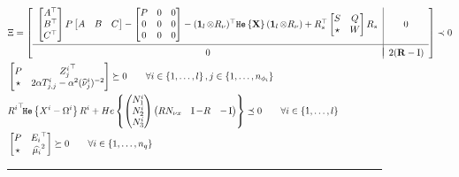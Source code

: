 \documentclass{ifacconf}
\theoremstyle{plain}
\begin{document}
\begin{figure}
\begin{subequations}\label{eqn:LMI}
\begin{align}\label{eqn:lyapunov}
  &\Xi =\left[\begin{matrix}
  \begin{array}{c|c}
  \left[\begin{matrix}\relax{A}^\top\\
  \relax{B}^\top\\
  C^\top
  \end{matrix}\right] P \left[\begin{matrix}\relax{A} & \relax{B} & C\end{matrix}\right] - \left[\begin{matrix}
  P & 0 & 0\\
  0 & 0 & 0\\
  0 & 0 & 0
  \end{matrix}\right] - (\operatorname{\mathbf{1}}_l \otimes R_{\nu})^\top \texttt{\relax{He}}\left\{{{\bf{X}}}\right\} (\operatorname{\mathbf{1}}_l \otimes R_{\nu})
   + R_s^\top \left[\begin{matrix}
    S & Q\\
    \star & W
  \end{matrix}\right]  R_s\hspace{.1em}& 0\\[1.5em]
\hline \\[-0.9em]
  0 & \hspace{.1em} 2 ({\bf{R}} - \operatorname{I})
  \end{array}\end{matrix}\right] \prec 0\\
  &\left[\begin{matrix}
    P & {Z_j^i}^\top\\
    \star & 2 \alpha T^i_{j,j} - \alpha^2 (\widehat{\nu}_j^i)^{-2}
  \end{matrix}\right] \succeq 0 \qquad \forall i \in \left\{ 1, \dots, l \right\}, j \in \left\{ 1, \dots, n_{\phi_i} \right\} \label{eqn:inclusion}\\
  &{R^i}^\top\! \texttt{\relax{He}}\left\{{X^i - \Omega^i}\right\} R^i + He\left\{ \left(\begin{matrix}N^i_1\\ N^i_2\\ N^i_3\end{matrix}\right) \left(\begin{matrix}R N_{\nu x} & \operatorname{I} - R & -\operatorname{I}\end{matrix}\right)\right\} \preceq 0 \qquad \forall i \in \left\{ 1, \dots, l \right\} \label{eqn:finsler_constraint}\\
  &\left[\begin{matrix}P & {E_i}^\top \\ \star & \widehat{\mu_i}^2\end{matrix}\right] \succeq 0 \qquad \forall i \in \left\{1, \dots, n_q \right\} \label{eqn:nonlin-inclusion-constraint}
\end{align}
\end{subequations}
\vspace{.5em}
\hrule
\end{figure}
\end{document}
